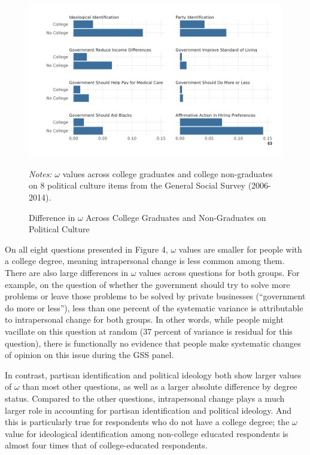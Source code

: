 \documentclass[
  12pt,
]{article}
\begin{document}
\begin{figure}[hbt]
\begin{center}
\caption{Difference in $\omega$ Across College Graduates and Non-Graduates on Political Culture}

\includegraphics[width=450px]{../figures/figure_4}

\end{center}
\footnotesize{\textit{Notes:} $\omega$ values across college graduates and college non-graduates on 8 political culture items from the General Social Survey (2006-2014).}
\end{figure}

On all eight questions presented in Figure 4, \(\omega\) values are
smaller for people with a college degree, meaning intrapersonal change
is less common among them. There are also large differences in
\(\omega\) values across questions for both groups. For example, on the
question of whether the government should try to solve more problems or
leave those problems to be solved by private businesses (``government do
more or less''), less than one percent of the systematic variance is
attributable to intrapersonal change for both groups. In other words,
while people might vacillate on this question at random (37 percent of
variance is residual for this question), there is functionally no
evidence that people make systematic changes of opinion on this issue
during the GSS panel.

In contrast, partisan identification and political ideology both show
larger values of \(\omega\) than most other questions, as well as a
larger absolute difference by degree status. Compared to the other
questions, intrapersonal change plays a much larger role in accounting
for partisan identification and political ideology. And this is
particularly true for respondents who do not have a college degree; the
\(\omega\) value for ideological identification among non-college
educated respondents is almost four times that of college-educated
respondents.
\end{document}

